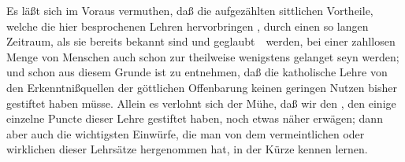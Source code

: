Es läßt sich im Voraus vermuthen, daß die aufgezählten sittlichen Vortheile, welche die hier besprochenen Lehren  hervorbringen , durch einen so langen Zeitraum, als sie bereits bekannt sind und geglaubt~\ werden, bei einer zahllosen Menge von Menschen auch schon zur  theilweise wenigstens gelanget seyn werden; und schon aus diesem Grunde ist zu entnehmen, daß die katholische Lehre von den Erkenntnißquellen der göttlichen Offenbarung keinen geringen Nutzen bisher gestiftet haben müsse. Allein es verlohnt sich der Mühe, daß wir den , den einige einzelne Puncte dieser Lehre gestiftet haben, noch etwas näher erwägen; dann aber auch die wichtigsten Einwürfe, die man von dem vermeintlichen oder wirklichen  dieser Lehrsätze hergenommen hat, in der Kürze kennen lernen.
